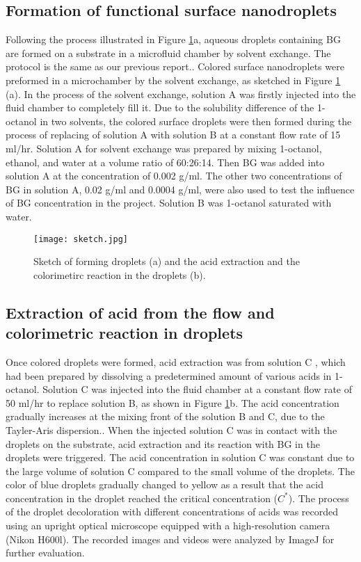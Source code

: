 \documentclass[journal=langd5,manuscript=article]{achemso}
\begin{document}
\subsection{Formation of functional surface nanodroplets}
Following the process illustrated in Figure \ref{fx0}a, aqueous droplets containing BG are formed on a substrate in a microfluid chamber by solvent exchange. The protocol is the same as our previous report.\cite{wei2020integrated}. Colored surface nanodroplets were preformed in a microchamber by the solvent exchange\cite{li2019functional,wei2020integrated}, as sketched in Figure \ref{fx0} (a). In the process of the solvent exchange, solution A was firstly injected into the fluid chamber to completely fill it. Due to the solubility difference of the 1-octanol in two solvents, the colored surface droplets were then formed during the process of replacing of solution A with solution B at a constant flow rate of 15 ml/hr. Solution A for solvent exchange was prepared by mixing 1-octanol, ethanol, and water at a volume ratio of 60:26:14. Then BG was added into solution A at the concentration of 0.002 g/ml. The other two concentrations of BG in solution A, 0.02 g/ml and 0.0004 g/ml, were also used to test the influence of BG concentration in the project. Solution B was 1-octanol saturated with water. 
\begin{figure}[htp]
\centering
	\texttt{[image: sketch.jpg]}
	\caption{ Sketch of forming droplets (a) and the acid extraction and the colorimetirc reaction in the droplets (b).}
	\label{fx0}
\end{figure}

\subsection{Extraction of acid from the flow and colorimetric reaction in droplets}
Once colored droplets were formed, acid extraction was from solution C , which had been prepared by dissolving a predetermined amount of various acids in 1-octanol. Solution C was injected into the fluid chamber at a constant flow rate of 50 ml/hr to replace solution B, as shown in Figure \ref{fx0}b. The acid concentration gradually increases at the mixing front of the solution B and C, due to the Tayler-Aris dispersion.\cite{taylor1953dispersion,aris1956dispersion}. When the injected solution C was in contact with the droplets on the substrate, acid extraction and its reaction with BG in the droplets were triggered. The acid concentration in solution C was constant due to the large volume of solution C compared to the small volume of the droplets. The color of blue droplets gradually changed to yellow as a result that the acid concentration in the droplet reached the critical concentration ($C^*$). The process of the droplet decoloration with different concentrations of acids was recorded using an upright optical microscope equipped with a high-resolution camera (Nikon H600l). The recorded images and videos were analyzed by ImageJ for further evaluation.
\end{document}
